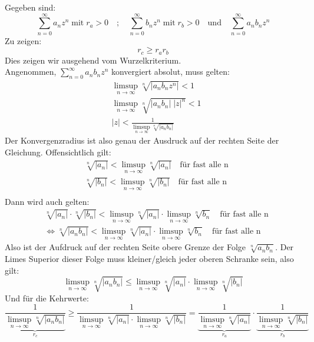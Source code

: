 \documentclass[a4paper,german,12pt,smallheadings]{scrartcl}
\begin{document}
Gegeben sind:
\begin{equation*}
\sum\limits_{n=0}^{\infty} a_n z^n \; \text{mit} \; r_a>0\quad ; \quad \sum\limits_{n=0}^{\infty} b_n z^n \; \text{mit} \; r_b>0 \quad \text{und} \quad  \sum\limits_{n=0}^{\infty} a_n b_n z^n
\end{equation*}
Zu zeigen:
\begin{equation*}
r_c \geq r_a r_b
\end{equation*}
Dies zeigen wir ausgehend vom Wurzelkriterium.\\
Angenommen, $\sum\limits_{n=0}^{\infty} a_n b_n z^n$ konvergiert absolut, muss gelten:
\begin{align*}
  & \limsup\limits_{n \to \infty} \sqrt[n]{|a_n b_n z^n|} < 1 \\
  & \limsup\limits_{n \to \infty} \sqrt[n]{|a_n b_n| \; |z|^n} < 1\\
  & |z| < \frac{1}{\limsup\limits_{n \to \infty} \sqrt[n]{|a_n b_n|}}
\end{align*}
Der Konvergenzradius ist also genau der Ausdruck auf der rechten Seite der Gleichung. Offensichtlich gilt:
\begin{align*}
  & \sqrt[n]{|a_n|}< \limsup\limits_{n \to \infty} \sqrt[n]{|a_n|} \quad \text{für fast alle n}\\
  & \sqrt[n]{|b_n|}< \limsup\limits_{n \to \infty} \sqrt[n]{|b_n|} \quad \text{für fast alle n}\\
\end{align*}
Dann wird auch gelten:
\begin{align*} 
  & \sqrt[n]{|a_n|} \cdot \sqrt[n]{|b_n|} < \limsup\limits_{n \to \infty} \sqrt[n]{|a_n|} \cdot \limsup\limits_{n \to \infty} \sqrt[n]{b_n} \quad \text{für fast alle n}\\
  & \Leftrightarrow \sqrt[n]{|a_n b_n|} < \limsup\limits_{n \to \infty} \sqrt[n]{|a_n|} \cdot \limsup\limits_{n \to \infty} \sqrt[n]{b_n} \quad \text{für fast alle n}
\end{align*}
Also ist der Aufdruck auf der rechten Seite obere Grenze der Folge $\sqrt[n]{a_n b_n}$. Der Limes Superior dieser Folge muss kleiner/gleich jeder oberen Schranke sein, also gilt:
\begin{equation*}
\limsup\limits_{n \to \infty} \sqrt[n]{|a_n b_n|} \leq \limsup\limits_{n \to \infty} \sqrt[n]{|a_n|} \cdot \limsup\limits_{n \to \infty} \sqrt[n]{|b_n|}
\end{equation*}
Und für die Kehrwerte:
\begin{equation*}
\underbrace{\frac{1}{\limsup\limits_{n \to \infty} \sqrt[n]{|a_n b_n|}}}_{r_c} \geq \frac{1}{\limsup\limits_{n \to \infty} \sqrt[n]{|a_n|} \cdot \limsup\limits_{n \to \infty} \sqrt[n]{|b_n|}}= \underbrace{\frac{1}{\limsup\limits_{n \to \infty} \sqrt[n]{|a_n|}}}_{r_a} \cdot \underbrace{\frac{1}{\limsup\limits_{n \to \infty} \sqrt[n]{|b_n|}}}_{r_b}
\end{equation*}
\end{document}

